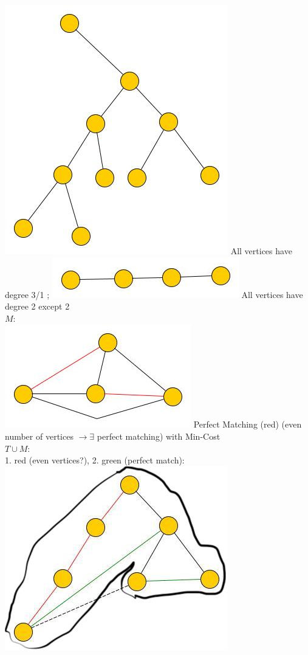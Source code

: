 \includegraphics[scale=0.25]{img/graph20} All vertices have degree 3/1 ; 
 \includegraphics[scale=0.25]{img/graph21} All vertices have degree 2 except 2 \\
 $M$: \\
 \includegraphics[scale=0.25]{img/graph22} Perfect Matching (red) (even number of vertices $\rightarrow \exists$ perfect matching) with Min-Cost \\
 $T \cup M$: \\
 1. red (even vertices?), 2. green (perfect match): \includegraphics[scale=0.25]{img/graph23} \\
